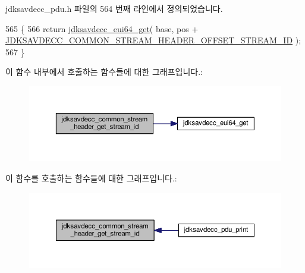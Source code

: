 jdksavdecc\+\_\+pdu.\+h 파일의 564 번째 라인에서 정의되었습니다.


\begin{DoxyCode}
565 \{
566     \textcolor{keywordflow}{return} \hyperlink{group__eui64_ga2652311a25a6b91cddbed75c108c7031}{jdksavdecc\_eui64\_get}( base, pos + 
      \hyperlink{group__jdksavdecc__avtp__common__stream__header_ga200678ec075c762133296947a5c8282f}{JDKSAVDECC\_COMMON\_STREAM\_HEADER\_OFFSET\_STREAM\_ID} );
567 \}
\end{DoxyCode}


이 함수 내부에서 호출하는 함수들에 대한 그래프입니다.\+:
\nopagebreak
\begin{figure}[H]
\begin{center}
\leavevmode
\includegraphics[width=350pt]{group__jdksavdecc__avtp__common__stream__header_gaaeb4237cce0457e51e4ca3b39ef4441c_cgraph}
\end{center}
\end{figure}




이 함수를 호출하는 함수들에 대한 그래프입니다.\+:
\nopagebreak
\begin{figure}[H]
\begin{center}
\leavevmode
\includegraphics[width=350pt]{group__jdksavdecc__avtp__common__stream__header_gaaeb4237cce0457e51e4ca3b39ef4441c_icgraph}
\end{center}
\end{figure}


